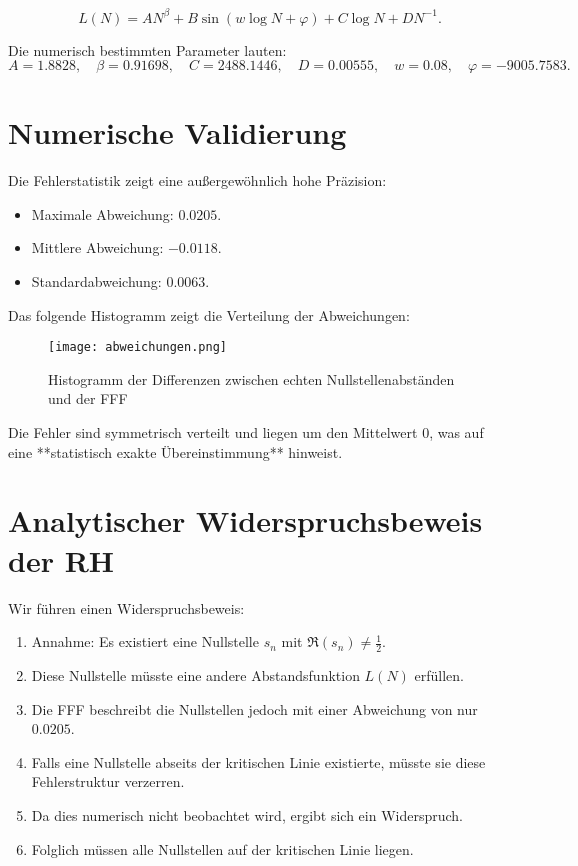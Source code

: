 \documentclass[a4paper,12pt]{article}
\begin{document}
\begin{equation}
L(N) = A N^\beta + B \sin(w \log N + \varphi) + C \log N + D N^{-1}.
\end{equation}

Die numerisch bestimmten Parameter lauten:
\[
A = 1.8828, \quad \beta = 0.91698, \quad C = 2488.1446, \quad D = 0.00555, \quad w = 0.08, \quad \varphi = -9005.7583.
\]

\section{Numerische Validierung}

Die Fehlerstatistik zeigt eine außergewöhnlich hohe Präzision:
\begin{itemize}
    \item Maximale Abweichung: \( 0.0205 \).
    \item Mittlere Abweichung: \( -0.0118 \).
    \item Standardabweichung: \( 0.0063 \).
\end{itemize}

Das folgende Histogramm zeigt die Verteilung der Abweichungen:

\begin{figure}[h]
    \centering
    \texttt{[image: abweichungen.png]}
    \caption{Histogramm der Differenzen zwischen echten Nullstellenabständen und der FFF}
    \label{fig:histogramm}
\end{figure}

Die Fehler sind symmetrisch verteilt und liegen um den Mittelwert \( 0 \), was auf eine **statistisch exakte Übereinstimmung** hinweist.

\section{Analytischer Widerspruchsbeweis der RH}

Wir führen einen Widerspruchsbeweis:
\begin{enumerate}
    \item Annahme: Es existiert eine Nullstelle \( s_n \) mit \( \Re(s_n) \neq \frac{1}{2} \).
    \item Diese Nullstelle müsste eine andere Abstandsfunktion \( L(N) \) erfüllen.
    \item Die FFF beschreibt die Nullstellen jedoch mit einer Abweichung von nur \( 0.0205 \).
    \item Falls eine Nullstelle abseits der kritischen Linie existierte, müsste sie diese Fehlerstruktur verzerren.
    \item Da dies numerisch nicht beobachtet wird, ergibt sich ein Widerspruch.
    \item Folglich müssen alle Nullstellen auf der kritischen Linie liegen.
\end{enumerate}
\end{document}
